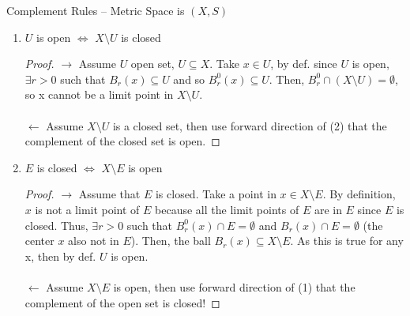 \documentclass[a4paper]{article}
\begin{document}
\begin{prop}
Complement Rules -- Metric Space is $(X, S)$ 
  \begin{enumerate}
    \item $U$ is open $\iff$ $X \setminus U$ is closed
      \begin{proof}
        $\to$ Assume $U$ open set, $U \subseteq X$.  Take $x \in U$, by def. since $U$ is open, $\exists r > 0$ such 
        that $B_r(x) \subseteq U$ and so $B_r^0 (x) \subseteq U$. Then, 
        $B_r^0 \cap (X \setminus U) = \emptyset$, so x cannot be a limit point in $X \setminus U$.  \\ \\
        $\leftarrow$ Assume $X \setminus U$ is a closed set, then use forward direction of (2) that the complement of the closed set is open.
      \end{proof}
    \item $E$ is closed $\iff$ $X\setminus E$ is open
      \begin{proof}
        $\to$ Assume that $E$ is closed. Take a point in $x \in X \setminus E$. By definition, $x$ is not a limit point 
        of $E$ because all the limit points of $E$ are in $E$ since $E$ is closed. Thus, $\exists r > 0$ such that
        $B_{r}^0 (x) \cap E = \emptyset$ and $B_{r} (x) \cap E = \emptyset$ (the center $x$ also not in $E$). Then, 
        the ball $B_r(x) \subseteq X \setminus E$. As this is true for any x, then by def. $U$ is open. \\ \\
        $\leftarrow$ Assume $X \setminus E$ is open, then use forward direction of (1) that the complement of the open set is closed!  
      \end{proof}
  \end{enumerate}
\end{prop}
\end{document}
